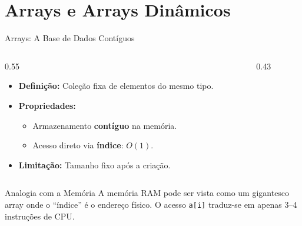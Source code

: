\documentclass[aspectratio=169]{beamer}
\begin{document}
\section{Arrays e Arrays Dinâmicos}

\begin{frame}{Arrays: A Base de Dados Contíguos}
    \begin{columns}[T]
        \begin{column}{0.55\textwidth}
            \begin{itemize}
                \item \textbf{Definição:} Coleção fixa de elementos do mesmo tipo.
                \item \textbf{Propriedades:}
                    \begin{itemize}
                        \item Armazenamento \textbf{contíguo} na memória.
                        \item Acesso direto via \textbf{índice}: $O(1)$.
                    \end{itemize}
                \item \textbf{Limitação:} Tamanho fixo após a criação.
            \end{itemize}
        \end{column}
        \begin{column}{0.43\textwidth}
            \centering
        \end{column}
    \end{columns}

    \vspace{0.4cm}
    \begin{block}{Analogia com a Memória}
        A memória RAM pode ser vista como um gigantesco array onde o ``índice'' é o endereço físico. O acesso \texttt{a[i]} traduz-se em apenas 3--4 instruções de CPU.
    \end{block}
\end{frame}
\end{document}

